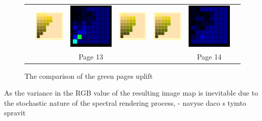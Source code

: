 \begin{figure}[t!]
{\begin{tabular}{ccccccc}
			&
			\includegraphics[width=.155\linewidth]{img/results_uplift_page13_ourFL11.png}
			& 
			\includegraphics[width=.155\linewidth]{img/results_uplift_page13_diff_ourFL11.png}
			&\quad
			\includegraphics[width=.155\linewidth]{img/results_uplift_page14_originalFL11.png}
			&
			\includegraphics[width=.155\linewidth]{img/results_uplift_page14_ourFL11.png}
			&
			\includegraphics[width=.155\linewidth]{img/results_uplift_page14_diff_ourFL11.png}\\
			& & Page 13 & & & Page 14 & \\
		\end{tabular}
	}
	\caption{The comparison of the green pages uplift}
	\label{fig:results_uplift_munsell_green_pages}
\end{figure}


 As the variance in the RGB value of the resulting image map is inevitable due to the stochastic nature of the spectral rendering process, - navyse daco s tymto spravit


